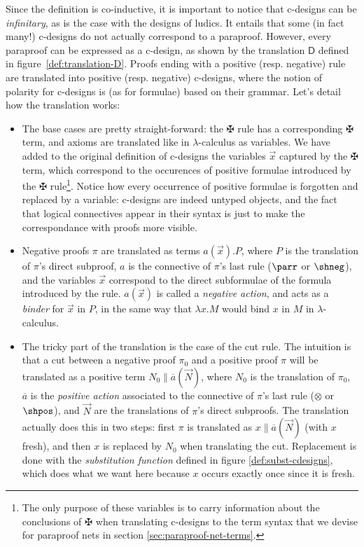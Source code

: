 \documentclass[12pt]{report}
\renewcommand{\b}[1]{\overline{#1}}
\newcommand{\dai}{✠}
\newcommand{\cutbar}{\mathbin{\|}}
\begin{document}
Since the definition is co-inductive, it is important to notice that c-designs can be
\emph{infinitary}, as is the case with the designs of ludics. It entails that some (in fact many!)
c-designs do not actually correspond to a paraproof. However, every paraproof can be expressed as a
c-design, as shown by the translation $\mathsf{D}$ defined in figure~\ref{def:translation-D}. Proofs
ending with a positive (resp. negative) rule are translated into positive (resp. negative)
c-designs, where the notion of polarity for c-designs is (as for formulae) based on their
grammar. Let's detail how the translation works:
\begin{itemize}
    \item The base cases are pretty straight-forward: the $\dai$ rule has a corresponding $\dai$
    term, and axioms are translated like in $\lambda$-calculus as variables. We have added to the
    original definition of c-designs the variables $\vec{x}$ captured by the $\dai$ term, which
    correspond to the occurences of positive formulae introduced by the $\dai$ rule\footnote{The
    only purpose of these variables is to carry information about the conclusions of $\dai$ when
    translating c-designs to the term syntax that we devise for paraproof nets in section
    \ref{sec:paraproof-net-terms}.}. Notice how every occurrence of positive formulae is forgotten
    and replaced by a variable: c-designs are indeed untyped objects, and the fact that logical
    connectives appear in their syntax is just to make the correspondance with proofs more visible. 
    \item Negative proofs $π$ are translated as terms $a(\vec{x}).P$, where $P$ is the translation
    of $π$'s direct subproof, $a$ is the connective of $π$'s last rule ($\parr$ or $\shneg$),
    and the variables $\vec{x}$ correspond to the direct subformulae of the formula introduced by
    the rule. $a(\vec{x})$ is called a \emph{negative action}, and acts as a \emph{binder} for
    $\vec{x}$ in $P$, in the same way that $\lambda x.M$ would bind $x$ in $M$ in
    $\lambda$-calculus.
    \item The tricky part of the translation is the case of the cut rule. The intuition is that a
    cut between a negative proof $π_0$ and a positive proof $π$ will be translated as a positive
    term $N_0 \cutbar \b{a}(\vec{N})$, where $N_0$ is the translation of $π_0$, $\b{a}$ is the
    \emph{positive action} associated to the connective of $π$'s last rule ($\otimes$ or $\shpos$),
    and $\vec{N}$ are the translations of $π$'s direct subproofs. The translation actually does this
    in two steps: first $π$ is translated as $x \cutbar \b{a}(\vec{N})$ (with $x$ fresh), and then
    $x$ is replaced by $N_0$ when translating the cut. Replacement is done with the
    \emph{substitution function} defined in figure \ref{def:subst-cdesigns}, which does what we want
    here because $x$ occurs exactly once since it is fresh.
\end{itemize}
\end{document}
